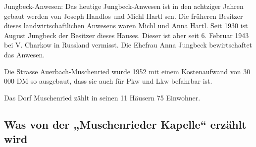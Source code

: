 \documentclass[12pt,a4pager]{book}
\begin{document}
Jungbeck-Anwesen: Das heutige Jungbeck-Anwesen ist in den achtziger Jahren
gebaut werden von Joseph Handlos und Michl Hartl sen. Die früheren Besitzer
dieses landwirtschaftlichen Anwesens waren Michl und Anna Hartl. Seit 1930 ist
August Jungbeck der Besitzer dieses Hauses. Dieser ist aber seit 6. Februar 1943
bei V. Charkow in Russland vermisst. Die Ehefrau Anna Jungbeck bewirtschaftet
das Anwesen.

Die Strasse Auerbach-Muschenried wurde 1952 mit einem Kostenaufwand von 30 000
DM so ausgebaut, dass sie auch für Pkw und Lkw befahrbar ist.

Das Dorf Muschenried zählt in seinen 11 Häusern 75 Einwohner.

\subsection{Was von der „Muschenrieder Kapelle“ erzählt wird}
\end{document}
